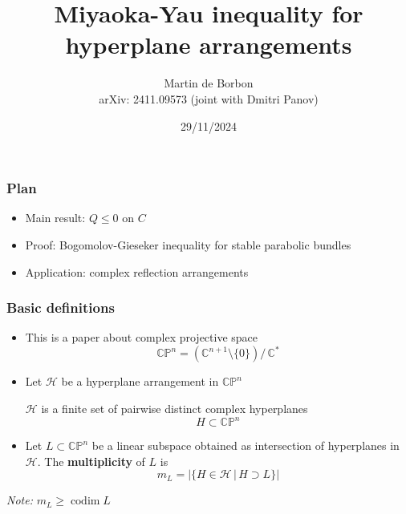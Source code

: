 \documentclass{beamer}
\title[]{Miyaoka-Yau inequality for hyperplane arrangements}
\author[Integrable Day at Loughborough]{Martin de Borbon \\
arXiv: 2411.09573 (joint with Dmitri Panov)}
\institute[]{Loughborough University}
\date{29/11/2024}
\newcommand{\C}{\mathbb{C}}
\newcommand{\CP}{\mathbb{CP}}
\newcommand{\mH}{\mathcal{H}}
\DeclareMathOperator{\codim}{codim}
\begin{document}
\begin{frame}
	\maketitle
\end{frame}




\begin{frame}
	\frametitle{Plan}
	\begin{itemize}
		\item Main result: \(Q \leq 0\) on \(C\)
		\vfill
		\item Proof: Bogomolov-Gieseker inequality for stable parabolic bundles
		\vfill
		\item Application: complex reflection arrangements
	\end{itemize}
\end{frame}


\begin{frame}
	\frametitle{Basic definitions}
	\begin{itemize}
		\item This is a paper about complex projective space
		\begin{equation*}
			\CP^n = \left(\C^{n+1} \setminus \{0\}\right) \big/ \, \C^*	
		\end{equation*} 
		\vfill
		
		\item Let \(\mH\) be a hyperplane arrangement in \(\CP^n\)
		
		\(\mH\) is a finite set of pairwise distinct complex hyperplanes 
		\[
		H \subset \CP^n 
		\]
		\vfill
		
		\item Let \(L \subset \CP^n\) be a linear subspace  obtained as intersection of hyperplanes in \(\mH\). 
		The \textbf{multiplicity} of \(L\) is
		\[
		m_L = \big| \{H \in \mH \,|\, H \supset L\} \big| 
		\]
	\end{itemize}
	
\emph{Note:} \(m_L \geq \codim L\)
\end{frame}
\end{document}
